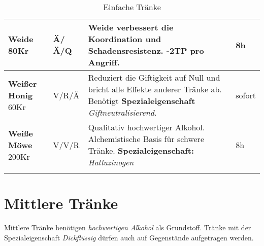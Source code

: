\begin{longtable}{|p{3cm}|p{}|p{8cm}|p{}|}
\textbf{Weide} \newline 80Kr & Ä/Ä/Q & Weide verbessert die Koordination und Schadensresistenz. -2TP pro Angriff. & 8h \\ \hline

\textbf{Weißer Honig} \newline 60Kr & V/R/Ä & Reduziert die Giftigkeit auf Null und bricht alle Effekte anderer Tränke ab. Benötigt \textbf{Spezialeigenschaft} \textit{Giftneutralisierend}. & sofort \\ \hline

\textbf{Weiße Möwe} \newline 200Kr & V/V/R & Qualitativ hochwertiger Alkohol. Alchemistische Basis für schwere Tränke. \textbf{Spezialeigenschaft:} \textit{Halluzinogen} & 8h \\ \hline

\caption{Einfache Tränke}
\label{tab:einfache_traenke}
\end{longtable}

\section{Mittlere Tränke}
Mittlere Tränke benötigen \textit{hochwertigen Alkohol} als Grundstoff. Tränke mit der Spezialeigenschaft \textit{Dickflüssig} dürfen auch auf Gegenstände aufgetragen werden.

